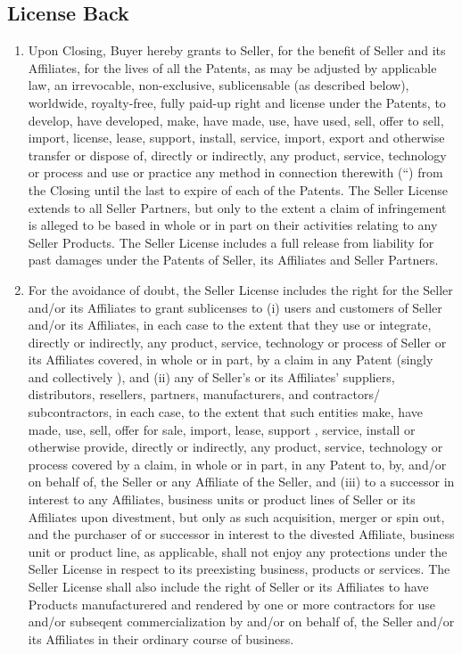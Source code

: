 \documentclass[letterpaper,10pt,english]{sphinxmanual}
\begin{document}
\subsection{License Back}
\label{\detokenize{3-transfer:license-back}}\begin{enumerate}
\def\theenumi{\alph{enumi}}
\def\labelenumi{(\theenumi )}
\makeatletter\def\p@enumii{\p@enumi (\theenumi )}\makeatother
\item {} 
Upon Closing, Buyer hereby grants to Seller, for the benefit of Seller and its Affiliates, for the lives of all the Patents, as may be adjusted by applicable law, an irrevocable, non-exclusive, sublicensable (as described below), worldwide, royalty-free, fully paid-up right and license under the Patents, to develop, have developed, make, have made, use, have used, sell, offer to sell, import, license, lease, support, install, service, import, export and otherwise transfer or dispose of, directly or indirectly, any product, service, technology or process and use or practice any method in connection therewith (“) from the Closing until the last to expire of each of the Patents. The Seller License extends to all Seller Partners, but only to the extent a claim of infringement is alleged to be based in whole or in part on their activities relating to any Seller Products. The Seller License includes a full release from liability for past damages under the Patents of Seller, its Affiliates and Seller Partners.

\item {} 
For the avoidance of doubt, the Seller License includes the right for the Seller and/or its Affiliates to grant sublicenses to (i) users and customers of Seller and/or its Affiliates, in each case to the extent that they use or integrate, directly  or indirectly, any product, service, technology or process of Seller or its Affiliates covered, in whole or in part, by a claim in any Patent (singly  and collectively ), and (ii) any of Seller’s or its Affiliates’ suppliers, distributors, resellers, partners, manufacturers, and contractors/ subcontractors, in each case, to the extent that such entities make, have made, use, sell, offer for sale, import, lease, support , service, install or otherwise provide, directly or indirectly, any product, service, technology or process covered by a claim, in whole or in part, in any Patent to, by, and/or on behalf of, the Seller or any Affiliate of the Seller, and (iii) to a successor in interest to any Affiliates, business units or product lines of Seller or its Affiliates upon divestment, but only as such acquisition, merger or spin out, and the purchaser of or successor in interest to the divested Affiliate, business unit or product line, as applicable, shall not enjoy any protections under the Seller License in respect to its preexisting business, products or services. The Seller License shall also include the right of Seller or its Affiliates to have Products manufacturered and rendered by one or more contractors for use and/or subseqent commercialization by and/or on behalf of, the Seller and/or its Affiliates in their ordinary course of business.


\end{enumerate}
\end{document}
